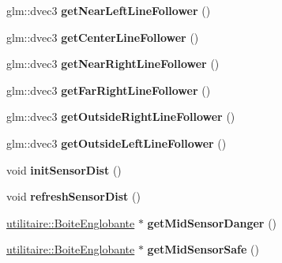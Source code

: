 \begin{DoxyCompactItemize}
\item 
\hypertarget{class_noeud_robot_a1f1328c1a6aeb64f1081450bc00a655b}{glm\-::dvec3 {\bfseries get\-Near\-Left\-Line\-Follower} ()}\label{class_noeud_robot_a1f1328c1a6aeb64f1081450bc00a655b}

\item 
\hypertarget{class_noeud_robot_ae6dda37a4de0925a2de01c0f37c0d095}{glm\-::dvec3 {\bfseries get\-Center\-Line\-Follower} ()}\label{class_noeud_robot_ae6dda37a4de0925a2de01c0f37c0d095}

\item 
\hypertarget{class_noeud_robot_aba2c676844bd16a00a1218bea8ea2b49}{glm\-::dvec3 {\bfseries get\-Near\-Right\-Line\-Follower} ()}\label{class_noeud_robot_aba2c676844bd16a00a1218bea8ea2b49}

\item 
\hypertarget{class_noeud_robot_a73c9a5b16232001210f40e1417de26e9}{glm\-::dvec3 {\bfseries get\-Far\-Right\-Line\-Follower} ()}\label{class_noeud_robot_a73c9a5b16232001210f40e1417de26e9}

\item 
\hypertarget{class_noeud_robot_a42d7455c744a45dc1b108e87918d796f}{glm\-::dvec3 {\bfseries get\-Outside\-Right\-Line\-Follower} ()}\label{class_noeud_robot_a42d7455c744a45dc1b108e87918d796f}

\item 
\hypertarget{class_noeud_robot_a1247f53d299f3cf0b4f1edac7c781253}{glm\-::dvec3 {\bfseries get\-Outside\-Left\-Line\-Follower} ()}\label{class_noeud_robot_a1247f53d299f3cf0b4f1edac7c781253}

\item 
\hypertarget{group__inf2990_ga80efd494c54af60ce2597e1819c8dea4}{void {\bfseries init\-Sensor\-Dist} ()}\label{group__inf2990_ga80efd494c54af60ce2597e1819c8dea4}

\item 
\hypertarget{group__inf2990_ga53f132a7876b353dd8a46164f6e19135}{void {\bfseries refresh\-Sensor\-Dist} ()}\label{group__inf2990_ga53f132a7876b353dd8a46164f6e19135}

\item 
\hypertarget{class_noeud_robot_af9cf290fd1186d2cd48795fac69dcb7a}{\hyperlink{structutilitaire_1_1_boite_englobante}{utilitaire\-::\-Boite\-Englobante} $\ast$ {\bfseries get\-Mid\-Sensor\-Danger} ()}\label{class_noeud_robot_af9cf290fd1186d2cd48795fac69dcb7a}

\item 
\hypertarget{class_noeud_robot_a978b3bc15dc8d998798464cf5e57fbdc}{\hyperlink{structutilitaire_1_1_boite_englobante}{utilitaire\-::\-Boite\-Englobante} $\ast$ {\bfseries get\-Mid\-Sensor\-Safe} ()}\label{class_noeud_robot_a978b3bc15dc8d998798464cf5e57fbdc}


\end{DoxyCompactItemize}

